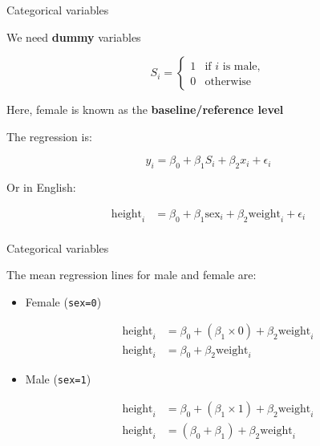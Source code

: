 \documentclass[pdf,handout]{beamer}
\begin{document}
\begin{frame}{Categorical variables}

We need \textbf{dummy} variables

$$
S_i = \left\{\begin{array}{ll}
        1 & \mbox{if $i$ is male},\\
        0 & \mbox{otherwise}
        \end{array}
        \right.
$$

Here, female is known as the \textbf{baseline/reference level}

The regression is:

$$
y_i = \beta_0 + \beta_1 S_i + \beta_2 x_i + \epsilon_i
$$

Or in English:

$$
\begin{aligned}
\mathrm{height}_i & = \beta_0 + \beta_1\mathrm{sex}_i + \beta_2\mathrm{weight}_i + \epsilon_i \\
\end{aligned}
$$

\end{frame}

\begin{frame}{Categorical variables}

The mean regression lines for male and female are:

\begin{itemize}\addtolength{\itemsep}{2\baselineskip}

\item Female (\texttt{sex=0})

$$
\begin{aligned}
    \mathrm{height}_i & = \beta_0 + (\beta_1 \times 0) + \beta_2\mathrm{weight}_i\\
    \mathrm{height}_i & = \beta_0 + \beta_2\mathrm{weight}_i
\end{aligned}
$$

\item Male (\texttt{sex=1})

$$
\begin{aligned}
    \mathrm{height}_i & = \beta_0 + (\beta_1 \times 1) + \beta_2\mathrm{weight}_i\\
    \mathrm{height}_i & = (\beta_0 + \beta_1) + \beta_2\mathrm{weight}_i
\end{aligned}
$$

\end{itemize}

\end{frame}
\end{document}
